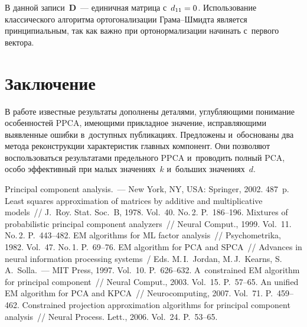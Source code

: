 \begin{multicols}{2}
     В данной записи~$\mathbf{D}$~--- единичная матрица с~$d_{11}\hm=0$. 
Использование классического алгоритма ортогонализации Гра\-ма--Шмид\-та 
является принципиальным, так как важно при ортонормализации начинать 
с~первого вектора.



\section{Заключение}

     В работе известные результаты дополнены деталями, углубляющими 
понимание особенностей PPCA, имеющими прикладное значение, 
ис\-прав\-ля\-ющи\-ми выявленные ошибки в~доступных пуб\-ли\-ка\-ци\-ях. Предложены 
и~обоснованы два метода реконструкции характеристик главных компонент. 
Они позволяют воспользоваться результатами предельного PPCA и~проводить 
полный PCA, особо эффективный при малых значениях~$k$ и~больших 
значениях~$d$.
     
{\small\frenchspacing
 {%
 \begin{thebibliography}{9}
 Principal component analysis.~--- New York, NY, USA: Springer, 2002. 487~p.
 Least squares approximation of matrices by additive and multiplicative 
models~// J.~Roy. Stat. Soc.~B, 1978. Vol.~40. No.\,2. P.~186--196.
 Mixtures of probabilistic principal component analyzers~// 
Neural Comput., 1999. Vol.~11. No.\,2. P.~443--482.
 EM algorithms for ML factor analysis~// Psychometrika, 1982. 
Vol.~47. No.\,1. P.~69--76.
 EM algorithm for PCA and SPCA~// 
Advances in neural information processing systems~/
Eds. M.\,I.~Jordan, M.\,J.~Kearns, S.\,A.~Solla.~--- MIT Press, 
1997. Vol.~10. P.~626--632.
 A~constrained EM algorithm for principal component~// Neural 
Comput., 2003. Vol.~15. P.~57--65.
 An unified EM algorithm for PCA and KPCA~// Neurocomputing, 2007. 
Vol.~71. P.~459--462.
 Constrained projection approximation algorithms for 
principal component analysis~// Neural Process. Lett., 2006. Vol.~24. P.~53--65.

 \end{thebibliography}

 }
 }

\end{multicols}

